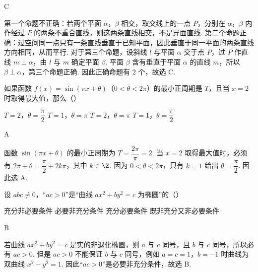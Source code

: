 \begin{answer}
C
\end{answer}

\begin{solution}
第一个命题不正确：若两个平面 \(\alpha\)，\(\beta\) 相交，取交线上的一点 \(P\)，分别在 \(\alpha\)，\(\beta\) 内作经过 \(P\) 的两条不重合直线，则这两条直线相交，不是异面直线. 第二个命题正确：过空间同一点只有一条直线垂直于已知平面，因此垂直于同一平面的两条直线方向相同，从而平行. 对于第三个命题，设斜线 \(l\) 与平面 \(\alpha\) 交于点 \(P\)，过 \(P\) 作直线 \(m\perp\alpha\)，由 \(l\) 与 \(m\) 确定平面 \(\beta\). 平面 \(\beta\) 含有垂直于平面 \(\alpha\) 的直线 \(m\)，所以 \(\beta\perp\alpha\)，第三个命题正确. 因此正确命题有 \(2\) 个，故选 C.
\end{solution}

\begin{problem}
如果函数 \(f(x)=\sin(\pi x+\theta)\)（\(0<\theta<2\pi\)）的最小正周期是 \(T\)，且当 \(x=2\) 时取得最大值，那么（\quad）

\choices
    {\(T=2\)，\(\theta=\dfrac{\pi}{2}\)}
    {\(T=1\)，\(\theta=\pi\)}
    {\(T=2\)，\(\theta=\pi\)}
    {\(T=1\)，\(\theta=\dfrac{\pi}{2}\)}
\end{problem}

\begin{answer}
A
\end{answer}

\begin{solution}
函数 \(\sin(\pi x+\theta)\) 的最小正周期为 \(T=\dfrac{2\pi}{\pi}=2\). 当 \(x=2\) 取得最大值时，必须有 \(2\pi+\theta=\dfrac\pi2+2k\pi\)，其中 \(k\in\Z\). 因为 \(0<\theta<2\pi\)，只有 \(k=1\) 给出 \(\theta=\dfrac\pi2\). 因此选 A.
\end{solution}

\begin{problem}
设 \(abc\neq0\)，“\(ac>0\)”是“曲线 \(ax^2+by^2=c\) 为椭圆”的（\quad）

\choices
    {充分非必要条件}
    {必要非充分条件}
    {充分必要条件}
    {既非充分又非必要条件}
\end{problem}

\begin{answer}
B
\end{answer}

\begin{solution}
若曲线 \(ax^2+by^2=c\) 是实的非退化椭圆，则 \(a\) 与 \(c\) 同号，且 \(b\) 与 \(c\) 同号，所以必有 \(ac>0\). 但是 \(ac>0\) 不能保证 \(b\) 与 \(c\) 同号，例如 \(a=c=1\)，\(b=-1\) 时曲线为双曲线 \(x^2-y^2=1\). 因此“\(ac>0\)”是必要非充分条件，故选 B.
\end{solution}


